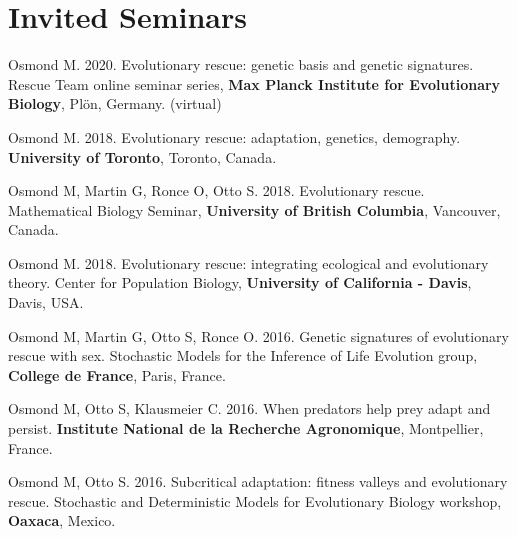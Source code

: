 \documentclass[12pt]{article}
\begin{document}
%

\newpage 
\section*{Invited Seminars}
Osmond M. 2020. Evolutionary rescue: genetic basis and genetic signatures. Rescue Team online seminar series, \textbf{Max Planck Institute for Evolutionary Biology}, Pl\"{o}n, Germany. (virtual)

Osmond M. 2018. Evolutionary rescue: adaptation, genetics, demography. \textbf{University of Toronto}, Toronto, Canada.

Osmond M, Martin G, Ronce O, Otto S. 2018. Evolutionary rescue. Mathematical Biology Seminar, \textbf{University of British Columbia}, Vancouver, Canada.

Osmond M. 2018. Evolutionary rescue: integrating ecological and evolutionary theory. Center for Population Biology, \textbf{University of California - Davis}, Davis, USA. 

Osmond M, Martin G, Otto S, Ronce O. 2016. Genetic signatures of evolutionary rescue with sex. Stochastic Models for the Inference of Life Evolution group, \textbf{College de France}, Paris, France. 

Osmond M, Otto S, Klausmeier C. 2016. When predators help prey adapt and persist. \textbf{Institute National de la Recherche Agronomique}, Montpellier, France. 

Osmond M, Otto S. 2016. Subcritical adaptation: fitness valleys and evolutionary rescue. Stochastic and Deterministic Models for Evolutionary Biology workshop, \textbf{Oaxaca}, Mexico. 

\end{document}
